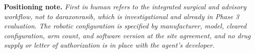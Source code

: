 \vspace{0.1em}
\noindent\footnotesize\textbf{Positioning note.} \textit{First in human refers
to the integrated surgical and advisory workflow, not to daraxonrasib, which is
investigational and already in Phase 3 evaluation. The robotic configuration is
specified by manufacturer, model, cleared configuration, arm count, and software
version at the site agreement, and no drug supply or letter of authorization is
in place with the agent's developer.}\normalsize\par
